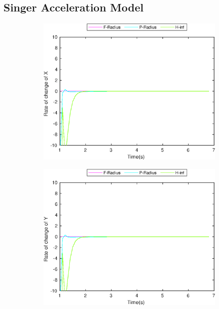 \subsection{Singer Acceleration Model}
\FloatBarrier
\begin{figure}[!h]
\begin{subfigure}{.5\linewidth}
\centering
\includegraphics[width=\linewidth]{figures/BoundChange/CS/cs_bound_changeX}
\end{subfigure}
\begin{subfigure}{.5\linewidth}
\centering
\includegraphics[width=\linewidth]{figures/BoundChange/CS/cs_bound_changeY}

\end{subfigure}
\end{figure}
